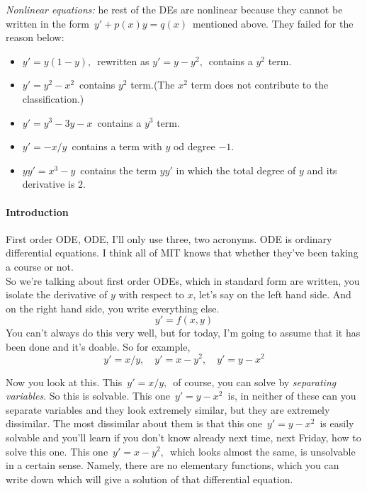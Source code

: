 \emph{Nonlinear equations:} he rest of the DEs are nonlinear because they cannot be written in the form
$\, y'+p(x)y=q(x)\,$ mentioned above. They failed for the reason below:
\begin{itemize}
\item $y' = y(1-y),\,$ rewritten as $y' = y - y^2,\,$ contains a $y^2$ term.
\item $y' = y^2 - x^2\,$ contains $y^2$ term.(The $x^2$ term does not contribute to the classification.)
\item $y' = y^3 -3y -x\,$ contains a $y^3$ term.
\item $y' = -x/y\,$ contains a term with $y$ od degree $-1$.
\item $yy' = x^3 -y\,$ contains the term $yy'$ in which the total degree of $y$ and its derivative is $2$. 
\end{itemize}

\paragraph{Introduction}
First order ODE, ODE, I'll only use three, two acronyms.
ODE is ordinary differential equations.
I think all of MIT knows that whether they've been taking a course or not.\\

So we're talking about first order ODEs, which
in standard form are written, you isolate the derivative of $y$
with respect to $x$, let's say on the left hand side.
And on the right hand side, you write everything else.
\begin{equation*}
  y' = f(x, y)
\end{equation*}
You can't always do this very well,
but for today, I'm going to assume that it has been done and it's doable.
So for example,
\begin{equation*}
  y' = x/y, \quad y' = x - y^2, \quad y' = y - x^2 
\end{equation*}

Now you look at this.
This $\, y' = x/y,\,$ of course, you can solve by \textit{separating variables}.
So this is solvable.
This one $\, y' = y - x^2\, $ is, in neither of these can you separate variables
and they look extremely similar, but they are extremely dissimilar.
The most dissimilar about them is
that this one $\, y' = y - x^2\, $ is easily solvable and you'll
learn if you don't know already next time, next Friday, how to solve this one.
This one $\, y' = x - y^2 ,\,$ which looks almost the same, is unsolvable in a certain sense.
Namely, there are no elementary functions,
which you can write down which will
give a solution of that differential equation.\\

